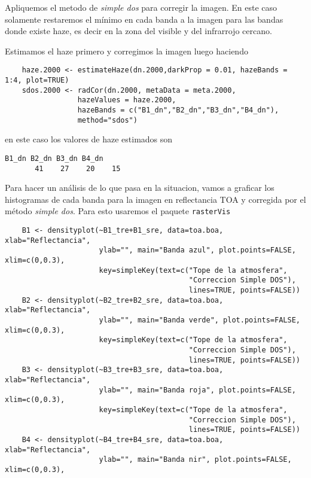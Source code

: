 \begin{exa}
    Apliquemos el metodo de \emph{simple dos} para corregir la imagen. En este caso
    solamente restaremos el m\'inimo en cada banda a la imagen para las bandas
    donde existe haze, es decir en la zona del visible y del infrarrojo cercano.

    Estimamos el haze primero y corregimos la imagen luego haciendo
    \begin{lstlisting}
    haze.2000 <- estimateHaze(dn.2000,darkProp = 0.01, hazeBands = 1:4, plot=TRUE)
    sdos.2000 <- radCor(dn.2000, metaData = meta.2000,
                 hazeValues = haze.2000,
                 hazeBands = c("B1_dn","B2_dn","B3_dn","B4_dn"),
                 method="sdos")
    \end{lstlisting}
    en este caso los valores de haze estimados son
    \begin{Verbatim}[fontsize=\small]
    B1_dn B2_dn B3_dn B4_dn
       41    27    20    15
    \end{Verbatim}
    Para hacer un an\'alisis de lo que pasa en la situacion, vamos a graficar los
    histogramas de cada banda para la imagen en reflectancia TOA y corregida por
    el m\'etodo \emph{simple dos}. Para esto usaremos el paquete \texttt{rasterVis}
    \begin{lstlisting}
    B1 <- densityplot(~B1_tre+B1_sre, data=toa.boa, xlab="Reflectancia",
                      ylab="", main="Banda azul", plot.points=FALSE, xlim=c(0,0.3),
                      key=simpleKey(text=c("Tope de la atmosfera",
                                           "Correccion Simple DOS"),
                                           lines=TRUE, points=FALSE))
    B2 <- densityplot(~B2_tre+B2_sre, data=toa.boa, xlab="Reflectancia",
                      ylab="", main="Banda verde", plot.points=FALSE, xlim=c(0,0.3),
                      key=simpleKey(text=c("Tope de la atmosfera",
                                           "Correccion Simple DOS"),
                                           lines=TRUE, points=FALSE))
    B3 <- densityplot(~B3_tre+B3_sre, data=toa.boa, xlab="Reflectancia",
                      ylab="", main="Banda roja", plot.points=FALSE, xlim=c(0,0.3),
                      key=simpleKey(text=c("Tope de la atmosfera",
                                           "Correccion Simple DOS"),
                                           lines=TRUE, points=FALSE))
    B4 <- densityplot(~B4_tre+B4_sre, data=toa.boa, xlab="Reflectancia",
                      ylab="", main="Banda nir", plot.points=FALSE, xlim=c(0,0.3),

\end{lstlisting}
\end{exa}
